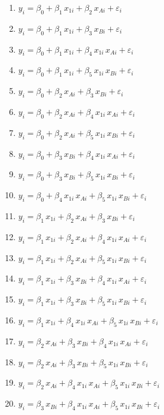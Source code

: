 \documentclass[
  letterpaper,
  DIV=11,
  numbers=noendperiod]{scrartcl}
\begin{document}
\begin{enumerate}
  \item $y_i = \beta_0 + \beta_1 \, x_{1i} + \beta_2 \, x_{Ai} + \varepsilon_i$
  \item $y_i = \beta_0 + \beta_1 \, x_{1i} + \beta_3 \, x_{Bi} + \varepsilon_i$
  \item $y_i = \beta_0 + \beta_1 \, x_{1i} + \beta_4 \, x_{1i} \, x_{Ai} + \varepsilon_i$
  \item $y_i = \beta_0 + \beta_1 \, x_{1i} + \beta_5 \, x_{1i} \, x_{Bi} + \varepsilon_i$
  \item $y_i = \beta_0 + \beta_2 \, x_{Ai} + \beta_3 \, x_{Bi} + \varepsilon_i$
  \item $y_i = \beta_0 + \beta_2 \, x_{Ai} + \beta_4 \, x_{1i} \, x_{Ai} +  \varepsilon_i$
  \item $y_i = \beta_0 + \beta_2 \, x_{Ai} + \beta_5 \, x_{1i} \, x_{Bi} + \varepsilon_i$
  \item $y_i = \beta_0 + \beta_3 \, x_{Bi} + \beta_4 \, x_{1i} \, x_{Ai} +  \varepsilon_i$
  \item $y_i = \beta_0 + \beta_3 \, x_{Bi} + \beta_5 \, x_{1i} \, x_{Bi} + \varepsilon_i$
  \item $y_i = \beta_0 + \beta_4 \, x_{1i} \, x_{Ai} + \beta_5 \, x_{1i} \, x_{Bi} + \varepsilon_i$
  \item $y_i = \beta_1 \, x_{1i} + \beta_2 \, x_{Ai} + \beta_3 \, x_{Bi} + \varepsilon_i$
  \item $y_i = \beta_1 \, x_{1i} + \beta_2 \, x_{Ai} + \beta_4 \, x_{1i} \, x_{Ai} + \varepsilon_i$
  \item $y_i = \beta_1 \, x_{1i} + \beta_2 \, x_{Ai} + \beta_5 \, x_{1i} \, x_{Bi} + \varepsilon_i$
  \item $y_i = \beta_1 \, x_{1i} + \beta_3 \, x_{Bi} + \beta_4 \, x_{1i} \, x_{Ai} + \varepsilon_i$
  \item $y_i = \beta_1 \, x_{1i} + \beta_3 \, x_{Bi} + \beta_5 \, x_{1i} \, x_{Bi} + \varepsilon_i$
  \item $y_i = \beta_1 \, x_{1i} + \beta_4 \, x_{1i} \, x_{Ai} + \beta_5 \, x_{1i} \, x_{Bi} + \varepsilon_i$
  \item $y_i = \beta_2 \, x_{Ai} + \beta_3 \, x_{Bi} + \beta_4 \, x_{1i} \, x_{Ai} + \varepsilon_i$
  \item $y_i = \beta_2 \, x_{Ai} + \beta_3 \, x_{Bi} + \beta_5 \, x_{1i} \, x_{Bi} + \varepsilon_i$
  \item $y_i = \beta_2 \, x_{Ai} + \beta_4 \, x_{1i} \, x_{Ai} + \beta_5 \, x_{1i} \, x_{Bi} + \varepsilon_i$
  \item $y_i = \beta_3 \, x_{Bi} + \beta_4 \, x_{1i} \, x_{Ai} + \beta_5 \, x_{1i} \, x_{Bi} + \varepsilon_i$
  


\end{enumerate}
\end{document}
